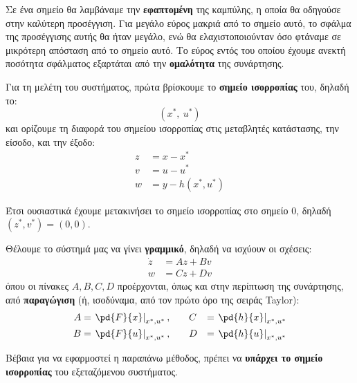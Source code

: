 \documentclass[11pt,a4paper,notitlepage,fleqn]{article}
\begin{document}
Σε ένα σημείο θα λαμβάναμε την \textbf{εφαπτομένη} της καμπύλης, η οποία
θα οδηγούσε στην καλύτερη προσέγγιση. Για μεγάλο εύρος μακριά από το
σημείο αυτό, το σφάλμα της προσέγγισης αυτής θα ήταν μεγάλο, ενώ θα
ελαχιστοποιούνταν όσο φτάναμε σε μικρότερη απόσταση από το σημείο αυτό.
Το εύρος εντός του οποίου έχουμε ανεκτή ποσότητα σφάλματος εξαρτάται
από την \textbf{ομαλότητα} της συνάρτησης.

Για τη μελέτη του συστήματος, πρώτα βρίσκουμε το \textbf{σημείο ισορροπίας} του, δηλαδή το:
\[
\left(x^*,\ u^*\right)
\]
και ορίζουμε τη διαφορά του σημείου ισορροπίας στις μεταβλητές κατάστασης, την είσοδο, και την έξοδο:
\begin{align*}
	z &= x - x^* \\
	v &= u - u^* \\
	w &= y - h(x^*, u^*)
\end{align*}

Έτσι ουσιαστικά έχουμε μετακινήσει το σημείο ισορροπίας στο σημείο
0, δηλαδή \( (z^*, v^*) = (0,0) \).

Θέλουμε το σύστημά μας να γίνει \textbf{γραμμικό}, δηλαδή να ισχύουν οι σχέσεις:
\begin{align*}
	\dot z &= Az + Bv\\
	w &= Cz + Dv
\end{align*}
όπου οι πίνακες \( A,B,C,D \) προέρχονται, όπως και στην περίπτωση της
συνάρτησης, από \textbf{παραγώγιση} (ή, ισοδύναμα, από τον πρώτο όρο
της σειράς Taylor):
\begin{alignat*}{3}
	A &= \left. \pd{F}{x} \right|_{x^*,u^*}, \quad&& C &=
	\left. \pd{h}{x}\right|_{x^*,u^*} \\
	B &= \left. \pd{F}{u} \right|_{x^*,u^*}, \quad&& D &=
	\left. \pd{h}{u}\right|_{x^*,u^*}
\end{alignat*}

Βέβαια για να εφαρμοστεί η παραπάνω μέθοδος, πρέπει να \textbf{υπάρχει το
	σημείο ισορροπίας} του εξεταζόμενου συστήματος.
\end{document}
